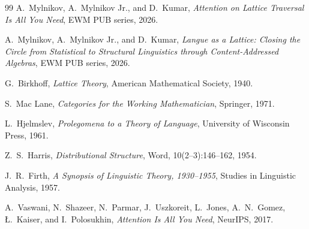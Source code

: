 \documentclass[11pt,a4paper]{article}
\theoremstyle{remark}
\begin{document}
\begin{thebibliography}{99}
 A.~Mylnikov, A.~Mylnikov Jr., and D.~Kumar,
\textit{Attention on Lattice Traversal Is All You Need}, EWM PUB series, 2026.

 A.~Mylnikov, A.~Mylnikov Jr., and D.~Kumar,
\textit{Langue as a Lattice: Closing the Circle from Statistical to
Structural Linguistics through Content-Addressed Algebras}, EWM PUB series,
2026.

 G.~Birkhoff,
\textit{Lattice Theory}, American Mathematical Society, 1940.

 S.~Mac Lane,
\textit{Categories for the Working Mathematician}, Springer, 1971.

 L.~Hjelmslev,
\textit{Prolegomena to a Theory of Language}, University of Wisconsin Press,
1961.

 Z.~S.~Harris,
\textit{Distributional Structure}, Word, 10(2--3):146--162, 1954.

 J.~R.~Firth,
\textit{A Synopsis of Linguistic Theory, 1930--1955}, Studies in Linguistic
Analysis, 1957.

 A.~Vaswani, N.~Shazeer, N.~Parmar, J.~Uszkoreit,
L.~Jones, A.~N.~Gomez, \L.~Kaiser, and I.~Polosukhin,
\textit{Attention Is All You Need}, NeurIPS, 2017.

\end{thebibliography}
\end{document}
